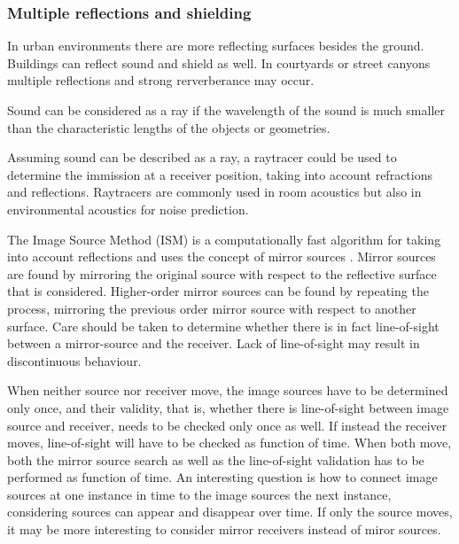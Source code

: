 




\subsubsection*{Multiple reflections and shielding} %
In urban environments there are more reflecting surfaces besides the ground.
Buildings can reflect sound and shield as well. In courtyards or street canyons
multiple reflections and strong rerverberance may occur.

Sound can be considered as a ray if the wavelength of the sound is much smaller
than the characteristic lengths of the objects or geometries. %

Assuming sound can be described as a ray, a raytracer could be used to determine
the immission at a receiver position, taking into account refractions and
reflections. Raytracers are commonly used in room acoustics but also in
environmental acoustics for noise prediction.

The Image Source Method (ISM) is a computationally fast algorithm for taking into
account reflections and uses the concept of mirror sources
\cite{Allen1979,Mechel2013}. Mirror sources are found by mirroring the original
source with respect to the reflective surface that is considered. Higher-order
mirror sources can be found by repeating the process, mirroring the previous
order mirror source with respect to another surface. Care should be taken to
determine whether there is in fact line-of-sight between a mirror-source and the
receiver. Lack of line-of-sight may result in discontinuous behaviour.

When neither source nor receiver move, the image sources have to be determined
only once, and their validity, that is, whether there is line-of-sight between
image source and receiver, needs to be checked only once as well. If instead the
receiver moves, line-of-sight will have to be checked as function of time. When
both move, both the mirror source search as well as the line-of-sight validation
has to be performed as function of time. An interesting question is how to
connect image sources at one instance in time to the image sources the next
instance, considering sources can appear and disappear over time. If only the
source moves, it may be more interesting to consider mirror receivers instead of
miror sources.

